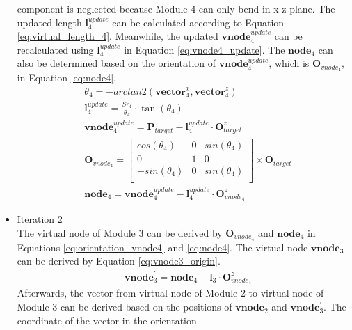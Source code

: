\begin{itemize}
    component is neglected because Module 4 can only bend in x-z plane. The updated length $\textbf{l}_{4}^{update}$ 
    can be calculated according to Equation \ref{eq:virtual_length_4}. Meanwhile, the updated 
    $\textbf{vnode}_{4}^{update}$ can be recalculated using $\textbf{l}_{4}^{update}$ in Equation \ref{eq:vnode4_update}. 
    The $\textbf{node}_4$ can also be determined based on the orientation of $\textbf{vnode}_{4}^{update}$, 
    which is $\textbf{O}_{vnode_4}$, in Equation \ref{eq:node4}.
    \begin{align}
        &\theta_4 = -arctan2(\textbf{vector}_{4}^{x},\textbf{vector}_{4}^{z})
        \label{eq:theta_4} \\
        &\textbf{l}_{4}^{update} = \frac{Sr_4}{\theta_4}\cdot \tan(\theta_4)
        \label{eq:virtual_length_4} \\
        &\textbf{vnode}_{4}^{update} = \textbf{P}_{target} - \textbf{l}_{4}^{update} \cdot \textbf{O}_{target}^{z}
        \label{eq:vnode4_update} \\
        &\textbf{O}_{vnode_4} =     
        \begin{bmatrix}
            cos(\theta_4) & 0 & sin(\theta_4) \\
            0 & 1 & 0 \\
            -sin(\theta_4) & 0 & sin(\theta_4) \\
        \end{bmatrix}  
        \times \textbf{O}_{target}
        \label{eq:orientation_vnode4} \\
        &\textbf{node}_4 = \textbf{vnode}_{4}^{update} - \textbf{l}_{4}^{update} \cdot \textbf{O}_{vnode_4}^{z}
        \label{eq:node4} 
    \end{align}
    \item Iteration 2 \\ %
    The virtual node of Module 3 can be derived by $\textbf{O}_{vnode_4}$ and $\textbf{node}_{4}$ in Equations 
    \ref{eq:orientation_vnode4} and \ref{eq:node4}. The virtual node $\textbf{vnode}_{3}$ can be derived by Equation 
    \ref{eq:vnode3_origin}.
    \begin{align}
        &\textbf{vnode}_{3}^{'} = \textbf{node}_{4} - \textbf{l}_{3} \cdot \textbf{O}_{vnode_4}^{z}
        \label{eq:vnode3_origin}
    \end{align}
    Afterwards, the vector from virtual node of Module 2 to virtual node of Module 3 can be derived based on the 
    positions of $\textbf{vnode}_{2}$ and $\textbf{vnode}_{3}^{'}$. The coordinate of the vector in the orientation 

\end{itemize}
